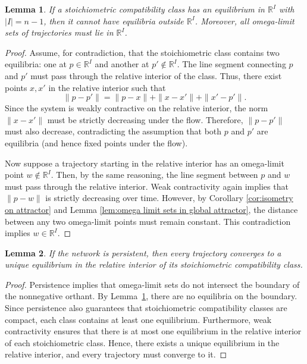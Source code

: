 \documentclass{article}
\newtheorem{lem}{Lemma}
\begin{document}
\begin{lem}
\label{lem:equilibria_in_boundary}
If a stoichiometric compatibility class has an equilibrium in \( \mathbb{R}^I \) with \( |I| = n-1 \), then it cannot have equilibria outside \( \mathbb{R}^I \). Moreover, all omega-limit sets of trajectories must lie in \( \mathbb{R}^I \).
\end{lem}

\begin{proof}
Assume, for contradiction, that the stoichiometric class contains two equilibria: one at \( p \in \mathbb{R}^I \) and another at \( p' \notin \mathbb{R}^I \). The line segment connecting \( p \) and \( p' \) must pass through the relative interior of the class. Thus, there exist points \( x, x' \) in the relative interior such that
\[
\|p - p'\| = \|p - x\| + \|x - x'\| + \|x' - p'\|.
\]
Since the system is weakly contractive on the relative interior, the norm \( \|x - x'\| \) must be strictly decreasing under the flow. Therefore, \( \|p - p'\| \) must also decrease, contradicting the assumption that both \( p \) and \( p' \) are equilibria (and hence fixed points under the flow).

Now suppose a trajectory starting in the relative interior has an omega-limit point \( w \notin \mathbb{R}^I \). Then, by the same reasoning, the line segment between \( p \) and \( w \) must pass through the relative interior. Weak contractivity again implies that \( \|p - w\| \) is strictly decreasing over time. However, by Corollary \ref{cor:isometry on attractor} and Lemma \ref{lem:omega limit sets in global attractor}, the distance between any two omega-limit points must remain constant. This contradiction implies \( w \in \mathbb{R}^I \).
\end{proof}



\begin{lem}
\label{lem:persistence_implies_convergence}
If the network is persistent, then every trajectory converges to a unique equilibrium in the relative interior of its stoichiometric compatibility class.
\end{lem}

\begin{proof}
Persistence implies that omega-limit sets do not intersect the boundary of the nonnegative orthant. By Lemma~\ref{lem:equilibria_in_boundary}, there are no equilibria on the boundary. Since persistence also guarantees that stoichiometric compatibility classes are compact, each class contains at least one equilibrium. Furthermore, weak contractivity ensures that there is at most one equilibrium in the relative interior of each stoichiometric class. Hence, there exists a unique equilibrium in the relative interior, and every trajectory must converge to it.
\end{proof}
\end{document}
